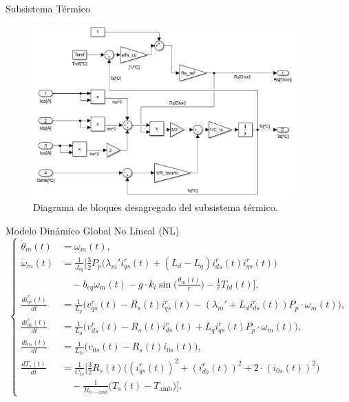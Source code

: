 \documentclass[12pt]{beamer}
\begin{document}
\begin{frame}{Subsistema Térmico}
\begin{figure}[h]
    \centering
    \includegraphics[width=0.9\textwidth]{Imagenes/BloquesSistTermico.png}
    \caption{Diagrama de bloques desagregado del subsistema térmico.}
\end{figure}
\end{frame}


\begin{frame}{Modelo Dinámico Global No Lineal (NL)}
    \scriptsize %
    \begin{equation}
    \left\{
    \begin{aligned}
    \dot{\theta}_m(t) &= \omega_m(t), \\
    \dot{\omega}_m(t) &= \frac{1}{J_{eq}} \Bigg[ \frac{3}{2} P_p \Big( \lambda_m' i_{qs}^r(t) + (L_d - L_q) i_{ds}^r(t) i_{qs}^r(t) \Big) \\
    &\quad - b_{eq} \omega_m(t) - g \cdot k_l \sin\Bigg(\frac{\theta_m(t)}{r}\Bigg) - \frac{1}{r} T_{ld}(t) \Bigg], \\
    \frac{d i_{qs}^r(t)}{dt} &= \frac{1}{L_q} \Big( v_{qs}^r(t) - R_s(t) i_{qs}^r(t) - (\lambda_m' + L_d i_{ds}^r(t)) P_p \cdot \omega_m(t) \Big), \\
    \frac{d i_{ds}^r(t)}{dt} &= \frac{1}{L_d} \Big( v_{ds}^r(t) - R_s(t) i_{ds}^r(t) + L_q i_{qs}^r(t) P_p \cdot \omega_m(t) \Big), \\
    \frac{d i_{0s}(t)}{dt} &= \frac{1}{L_{ls}} \Big( v_{0s}(t) - R_s(t) i_{0s}(t) \Big), \\
    \frac{d T_s(t)}{dt} &= \frac{1}{C_{ts}} \Bigg[ \frac{3}{2} R_s(t) \Big( (i_{qs}^r(t))^2 + (i_{ds}^r(t))^2 + 2 \cdot (i_{0s}(t))^2 \Big) \\
    &\quad - \frac{1}{R_{ts-amb}} \big( T_s(t) - T_{\text{amb}} \big) \Bigg].
    \end{aligned}
    \right.
    \end{equation}
\end{frame}
\end{document}
